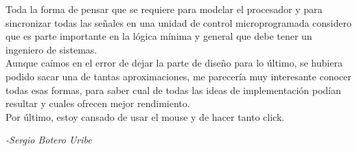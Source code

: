 Toda la forma de pensar que se requiere para modelar el procesador y para sincronizar todas las señales en una unidad
de control microprogramada considero que es parte importante en la lógica mínima y general que debe tener un ingeniero
de sistemas.\\ Aunque caímos en el error de dejar la parte de diseño para lo último, se hubiera podido sacar una de tantas
aproximaciones, me parecería muy interesante conocer todas esas formas, para saber cual de todas las ideas de
implementación podían resultar y cuales ofrecen mejor rendimiento.\\
Por último, estoy cansado de usar el mouse y de hacer tanto click.

\begin{flushright} 
	\itshape{-Sergio Botero Uribe}
\end{flushright}